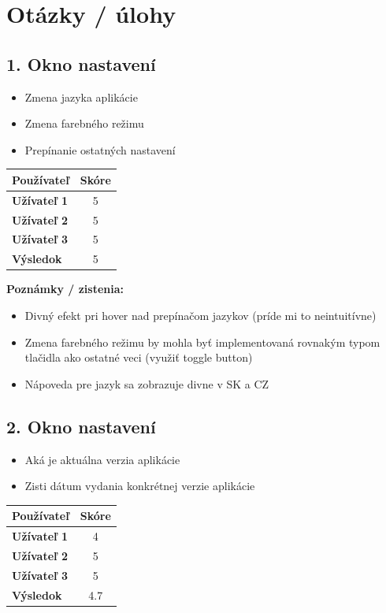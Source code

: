 \documentclass[a4paper,12pt]{article}
\begin{document}
\section*{Otázky / úlohy}

\subsection*{1. Okno nastavení}
\begin{itemize}
    \item Zmena jazyka aplikácie
    \item Zmena farebného režimu 
    \item Prepínanie ostatných nastavení 
\end{itemize}

\begin{longtable}{>{\bfseries}l c}
\toprule
Používateľ & Skóre \\
\midrule
Užívateľ 1 & 5 \\
Užívateľ 2 & 5 \\
Užívateľ 3 & 5 \\
Výsledok & 5 \\
\bottomrule
\end{longtable}

\textbf{Poznámky / zistenia:}
\begin{itemize}
    \item Divný efekt pri hover nad prepínačom jazykov (príde mi to neintuitívne)
    \item Zmena farebného režimu by mohla byť implementovaná rovnakým typom tlačidla ako ostatné veci (využiť toggle button)
    \item Nápoveda pre jazyk sa zobrazuje divne v SK a CZ
\end{itemize}

\newpage
\subsection*{2. Okno nastavení}
\begin{itemize}
    \item Aká je aktuálna verzia aplikácie 
    \item Zisti dátum vydania konkrétnej verzie aplikácie 
\end{itemize}

\begin{longtable}{>{\bfseries}l c}
\toprule
Používateľ & Skóre \\
\midrule
Užívateľ 1 & 4 \\
Užívateľ 2 & 5 \\
Užívateľ 3 & 5 \\
Výsledok & 4.7 \\
\bottomrule
\end{longtable}
\end{document}

